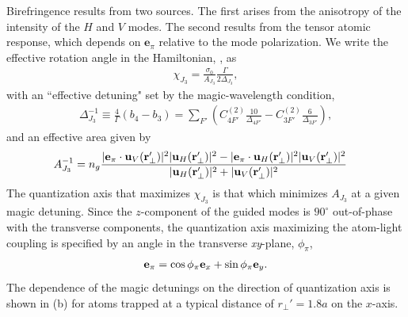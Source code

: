 \documentclass[aps,pra,twocolumn]{revtex4-1} %
\newcommand{\qaxis}{\mathbf{e}_\pi}
\newcommand{\chieff}{\chi_{J_3}}
\newcommand{\comment}[1]{{\color{Maroon} #1}}
\begin{document}
Birefringence results from two sources.  
The first arises from the anisotropy of the intensity of the $H$ and $V$ modes.  
The second results from the tensor atomic response, which depends on $\mathbf{e}_\pi$ relative to the mode polarization. 
We write the effective rotation angle in the Hamiltonian, , as
	\begin{align} \label{Eq::chieff}
		\chieff = \frac{\sigma_0}{A_{J_3}} \frac{\Gamma}{ 2 \Delta_{J_3}},
	\end{align}
with an ``effective detuning" set by the magic-wavelength condition,
	\begin{align} \label{Eq::SqueezingEffectiveDetuning}
		 \Delta_{J_3}^{-1} \equiv \frac{4}{\Gamma} (b_4 - b_3) =   \sum_{F'}  \left( C^{(2)}_{4F'}\frac{10}{\Delta_{4F'}} -  C^{(2)}_{3F'}\frac{6}{ \Delta_{3F'} } \right),
	\end{align}
and an effective area given by
	\begin{align} \label{Eq::SqueezingModeArea}
		A_{J_3}^{-1} & = n_g \frac{ |\mathbf{e}_\pi \cdot \mathbf{u}_V(\mathbf{r}'_\perp)|^2 |\mathbf{u}_H(\mathbf{r}'_\perp)|^2 - |\mathbf{e}_\pi \cdot \mathbf{u}_H(\mathbf{r}'_\perp) |^2 |\mathbf{u}_V(\mathbf{r}'_\perp)|^2 }{ |\mathbf{u}_H(\mathbf{r}'_\perp)|^2 + |\mathbf{u}_V(\mathbf{r}'_\perp)|^2 } 
	\end{align}	
The quantization axis that maximizes $\chieff$ is that which minimizes $A_{J_3}$ at a given magic detuning.  
Since the $z$-component of the guided modes is $90^\circ$ out-of-phase with the transverse components, the quantization axis maximizing the atom-light coupling is specified by an angle in the transverse \emph{xy}-plane, $\phi_\pi$,
	\begin{align} \label{Eq::QuantizationAxis}
		\qaxis = \cos \phi_\pi \mbf{e}_x + \sin \phi_\pi \mbf{e}_y.
	\end{align}
The dependence of the magic detunings on the direction of quantization axis is shown in (b) for atoms trapped at a typical distance of $r_\perp'=1.8a$ on the $x$-axis.   
\end{document}
